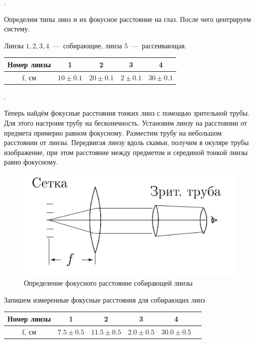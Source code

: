 \documentclass[a4paper, 12pt]{article}
\newcounter{Points}
\newcommand{\point}{\arabic{Points}. \addtocounter{Points}{1}}
\begin{document}
\point Определим типы линз и их фокусное расстояние на глаз. После чего центрируем систему.

Линзы $1, 2, 3, 4$~---~собирающие, линза $5$~---~рассеивающая. 

\begin{table}[!h]
\centering
\begin{tabular}{|c|c|c|c|c|} \hline
	Номер линзы & 1 & 2 & 3 & 4 \\ \hline
	f, см & $10 \pm 0.1$ & $20 \pm 0.1$ & $2 \pm 0.1$ & $30 \pm 0.1$ \\ \hline
\end{tabular}
\end{table}

\point Теперь найдём фокусные расстояния тонких линз с помощью зрительной трубы. Для этого настроим трубу на бесконечность. Установим линзу на расстоянии от предмета примерно равном фокусному. Разместим трубу на небольшом расстоянии от линзы. Передвигая линзу вдоль скамьи, получим в окуляре трубы изображение, при этом расстояние между предметом и серединой тонкой линзы равно фокусному.

\begin{figure}[!h]
	\centering
	\includegraphics[scale = 0.3]{412-1.png}
	\caption{Определение фокусного расстояние собирающей линзы}
	\label{pic1}
\end{figure}

Запишем измеренные фокусные расстояния для собирающих линз\\
	
\begin{table}[!h]
\centering
\begin{tabular}{|c|c|c|c|c|c|} \hline
	Номер линзы & 1 & 2 & 3 & 4 \\ \hline
	f, см & $7.5 \pm 0.5$ & $11.5 \pm 0.5$ & $2.0 \pm 0.5$ & $30.0 \pm 0.5$ \\ \hline
\end{tabular}
\end{table}
\end{document}
